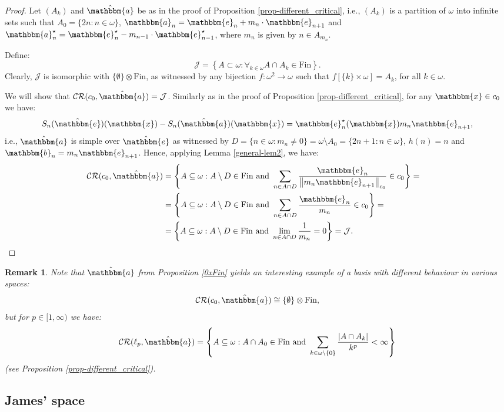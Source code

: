 \documentclass{amsart}
\newcommand{\J}{\mathcal{J}}
\newcommand{\Fin}{\mathrm{Fin}}
\newcommand{\CR}{\mathcal{CR}}
\newcommand{\w}{\mathbbm}
\newtheorem{remark}[theorem]{Remark}
\begin{document}
\begin{proof}
Let $(A_k)$ and $\hat{\w{a}}$ be as in the proof of Proposition \ref{prop-different_critical}, i.e., $(A_k)$ is a partition of $\omega$ into infinite sets such that $A_0=\{2n:n\in\omega\}$, $\w{a}_n=\w{e}_{n}+m_n\cdot \w{e}_{n+1}$ and $\w{a}_n^\star=\w{e}_{n}^\star - m_{n-1}\cdot \w{e}_{n-1}^\star$, where $m_n$ is given by $n\in A_{m_n}$.

Define:
\[
\J=\left\{A\subset\omega:\forall_{k\in\omega}A\cap A_k\in\Fin\right\}. 
\]
Clearly, $\J$ is isomorphic with $\{\emptyset\}\otimes\Fin$, as witnessed by any bijection $f:\omega^2\to\omega$ such that $f[\{k\}\times\omega]=A_k$, for all $k\in\omega$.

We will show that $\CR(c_0,\hat{\w{a}})=\J$. Similarly as in the proof of Proposition \ref{prop-different_critical}, for any $\w{x} \in c_0$ we have: 
\[
S_n(\hat{\w{e}})(\w{x})-S_n(\hat{\w{a}})(\w{x})=\w{e}_{n}^\star(\w{x})m_n\w{e}_{n+1},
\]
i.e., $\hat{\w{a}}$ is simple over $\hat{\w{e}}$ as witnessed by $D=\{n\in\omega:m_n\neq 0\}=\omega\setminus A_0=\{2n+1:n\in\omega\}$, $h(n)=n$ and $\w{b}_n=m_n\w{e}_{n+1}$. Hence, applying Lemma \ref{general-lem2}, we have:
\begin{align*}
\CR(c_0,\hat{\w{a}}) & =\left\{A\subseteq\omega: A\setminus D\in\Fin\text{ and }\sum_{n\in A\cap D}\frac{\w{e}_{n}}{\left\|m_n\w{e}_{n+1}\right\|_{c_0}}\in c_0\right\}=\cr
& =\left\{A\subseteq\omega: A\setminus D\in\Fin\text{ and }\sum_{n\in A\cap D}\frac{\w{e}_{n}}{m_n}\in c_0\right\}=\cr
& =\left\{A\subseteq\omega: A\setminus D\in\Fin\text{ and }\lim_{n\in A\cap D}\frac{1}{m_n}=0\right\}=\J.   
\end{align*}
\end{proof}

\begin{remark}
Note that $\hat{\w{a}}$ from Proposition \ref{0xFin} yields an interesting example of a basis with different behaviour in various spaces: 
\[\CR(c_0,\hat{\w{a}})\cong\{\emptyset\}\otimes\Fin,\]
but for $p\in [1,\infty)$ we have:
\[
\CR(\ell_p,\hat{\w{a}})=\left\{A\subseteq\omega:A\cap A_0\in\Fin\text{ and }\sum_{k\in\omega\setminus\{0\}}\frac{|A\cap A_k|}{k^p}<\infty\right\}
\]
(see Proposition \ref{prop-different_critical}).
\end{remark}

\subsection{James' space}
\end{document}

